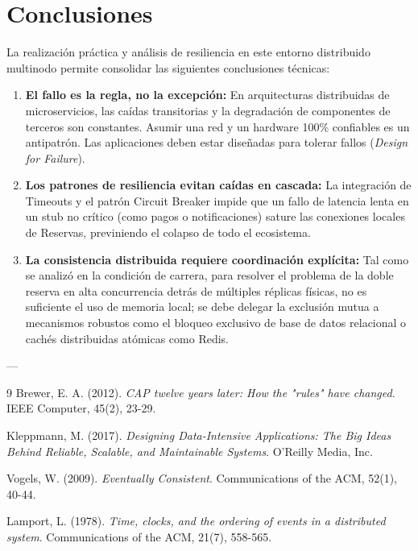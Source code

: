 \documentclass[12pt,letterpaper]{article}
\begin{document}
\section{Conclusiones}
La realización práctica y análisis de resiliencia en este entorno distribuido multinodo permite consolidar las siguientes conclusiones técnicas:
\begin{enumerate}
    \item \textbf{El fallo es la regla, no la excepción:} En arquitecturas distribuidas de microservicios, las caídas transitorias y la degradación de componentes de terceros son constantes. Asumir una red y un hardware 100\% confiables es un antipatrón. Las aplicaciones deben estar diseñadas para tolerar fallos (\textit{Design for Failure}).
    \item \textbf{Los patrones de resiliencia evitan caídas en cascada:} La integración de Timeouts y el patrón Circuit Breaker impide que un fallo de latencia lenta en un stub no crítico (como pagos o notificaciones) sature las conexiones locales de Reservas, previniendo el colapso de todo el ecosistema.
    \item \textbf{La consistencia distribuida requiere coordinación explícita:} Tal como se analizó en la condición de carrera, para resolver el problema de la doble reserva en alta concurrencia detrás de múltiples réplicas físicas, no es suficiente el uso de memoria local; se debe delegar la exclusión mutua a mecanismos robustos como el bloqueo exclusivo de base de datos relacional o cachés distribuidas atómicas como Redis.
\end{enumerate}

---

\begin{thebibliography}{9}
    Brewer, E. A. (2012). \textit{CAP twelve years later: How the "rules" have changed}. IEEE Computer, 45(2), 23-29.
    
    Kleppmann, M. (2017). \textit{Designing Data-Intensive Applications: The Big Ideas Behind Reliable, Scalable, and Maintainable Systems}. O'Reilly Media, Inc.
    
    Vogels, W. (2009). \textit{Eventually Consistent}. Communications of the ACM, 52(1), 40-44.

    Lamport, L. (1978). \textit{Time, clocks, and the ordering of events in a distributed system}. Communications of the ACM, 21(7), 558-565.
\end{thebibliography}
\end{document}
